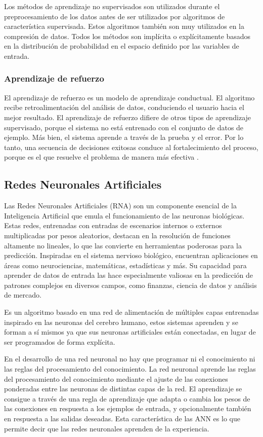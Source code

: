 Los métodos de aprendizaje no supervisados son utilizados durante el preprocesamiento de los datos antes de ser utilizados por algoritmos de característica supervisada. Estos algoritmos también son muy utilizados en la compresión de datos. Todos los métodos son implícita o explícitamente basados en la distribución de probabilidad en el espacio definido por las variables de entrada\cite{de2014aprendizaje}.

\subsubsection{Aprendizaje de refuerzo}

El aprendizaje de refuerzo es un modelo de aprendizaje conductual. El algoritmo recibe retroalimentación del análisis de datos, conduciendo el usuario hacia el mejor resultado. El aprendizaje de refuerzo difiere de otros tipos de aprendizaje supervisado, porque el sistema no está entrenado con el conjunto de datos de ejemplo. Más bien, el sistema aprende a través de la prueba y el error. Por lo tanto, una secuencia de decisiones exitosas conduce al fortalecimiento del proceso, porque es el que resuelve el problema de manera más efectiva \cite{ibm}.

\subsection{Redes Neuronales Artificiales}
Las Redes Neuronales Artificiales (RNA) son un componente esencial de la Inteligencia Artificial que emula el funcionamiento de las neuronas biológicas. Estas redes, entrenadas con entradas de escenarios internos o externos multiplicadas por pesos aleatorios, destacan en la resolución de funciones altamente no lineales, lo que las convierte en herramientas poderosas para la predicción. Inspiradas en el sistema nervioso biológico, encuentran aplicaciones en áreas como neurociencias, matemáticas, estadísticas y más. Su capacidad para aprender de datos de entrada las hace especialmente valiosas en la predicción de patrones complejos en diversos campos, como finanzas, ciencia de datos y análisis de mercado.

Es un algoritmo basado en una red de alimentación de múltiples capas entrenadas inspirado en las neuronas del cerebro humano, estos sistemas aprenden y se forman a sí mismos ya que sus neuronas artificiales están conectadas, en lugar de ser programados de forma explícita\cite{herrera2020prediccion }.

\vspace{1\baselineskip}
En el desarrollo de una red neuronal no hay que programar ni el conocimiento ni las reglas del procesamiento del conocimiento. La red neuronal aprende las reglas del procesamiento del conocimiento mediante el ajuste de las conexiones ponderadas entre las neuronas de distintas capas de la red.
El aprendizaje se consigue a través de una regla de aprendizaje que adapta o cambia los pesos de las conexiones en respuesta a los ejemplos de entrada, y opcionalmente también en respuesta a las salidas deseadas. Esta característica de las ANN es lo que permite decir que las redes neuronales aprenden de la experiencia\cite{olabe1998redes}. 

